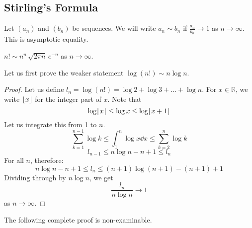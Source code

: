 \subsection{Stirling's Formula}
Let \((a_n)\) and \((b_n)\) be sequences.
We will write \(a_n \sim b_n\) if \(\frac{a_n}{b_n} \to 1\) as \(n \to \infty\).
This is asymptotic equality.
\begin{theorem}
	\(n!
	\sim n^n\, \sqrt{2 \pi n}\, e^{-n}\) as \(n \to \infty\).
\end{theorem}
\noindent Let us first prove the weaker statement \(\log (n!) \sim n \log n\).
\begin{proof}
	Let us define \(l_n = \log (n!) = \log 2 + \log 3 + \dots + \log n\).
	For \(x \in \mathbb R\), we write \(\lfloor x\rfloor\) for the integer part of \(x\).
	Note that
	\[
		\log \lfloor x\rfloor \leq \log x \leq \log \lfloor x+1\rfloor
	\]
	Let us integrate this from 1 to \(n\).
	\[
		\sum_{k=1}^{n-1} \log k \leq \int_1^n \log x\dd{x} \leq \sum_{k=2}^{n} \log k
	\]
	\[
		l_{n-1} \leq n \log n - n + 1 \leq l_n
	\]
	For all \(n\), therefore:
	\[
		n \log n - n + 1 \leq l_n \leq (n+1) \log (n+1) - (n+1) + 1
	\]
	Dividing through by \(n\log n\), we get
	\[
		\frac{l_n}{n \log n} \to 1
	\]
	as \(n \to \infty\).
\end{proof}
\noindent The following complete proof is non-examinable.
